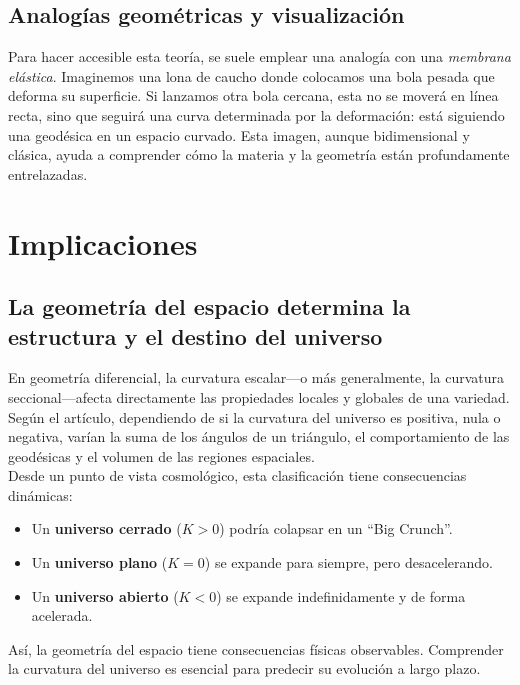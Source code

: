 \documentclass{aleph-revista}
\begin{document}
\subsection*{Analogías geométricas y visualización}
Para hacer accesible esta teoría, se suele emplear una analogía con una \textit{membrana elástica}. Imaginemos una lona de caucho donde colocamos una bola pesada que deforma su superficie. Si lanzamos otra bola cercana, esta no se moverá en línea recta, sino que seguirá una curva determinada por la deformación: está siguiendo una geodésica en un espacio curvado. Esta imagen, aunque bidimensional y clásica, ayuda a comprender cómo la materia y la geometría están profundamente entrelazadas.
\section{Implicaciones}
\subsection*{La geometría del espacio determina la estructura y el destino del universo}
En geometría diferencial, la curvatura escalar—o más generalmente, la curvatura seccional—afecta directamente las propiedades locales y globales de una variedad. Según el artículo, dependiendo de si la curvatura del universo es positiva, nula o negativa, varían la suma de los ángulos de un triángulo, el comportamiento de las geodésicas y el volumen de las regiones espaciales.\\
Desde un punto de vista cosmológico, esta clasificación tiene consecuencias dinámicas:
\begin{itemize}
  \item Un \textbf{universo cerrado} ($K > 0$) podría colapsar en un “Big Crunch”.
  \item Un \textbf{universo plano} ($K = 0$) se expande para siempre, pero desacelerando.
  \item Un \textbf{universo abierto} ($K < 0$) se expande indefinidamente y de forma acelerada.
\end{itemize}
Así, la geometría del espacio tiene consecuencias físicas observables. Comprender la curvatura del universo es esencial para predecir su evolución a largo plazo.
\end{document}
